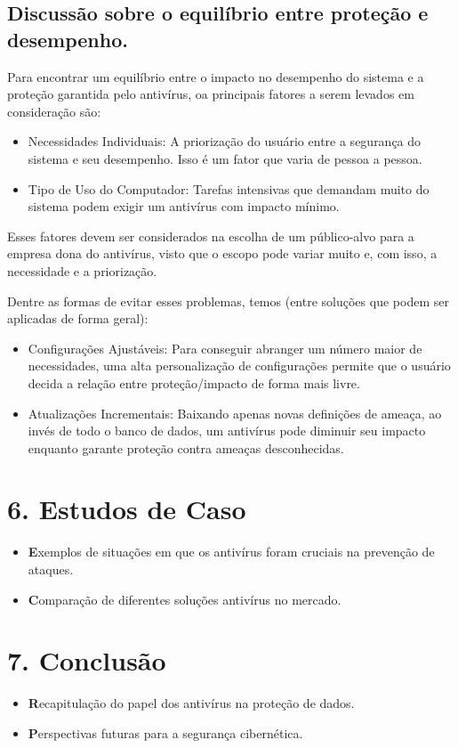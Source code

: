 \documentclass[10pt,conference,twocolumn]{article}
\begin{document}
\subsection*{Discussão sobre o equilíbrio entre proteção e desempenho.}
Para encontrar um equilíbrio entre o impacto no desempenho do sistema e a proteção garantida pelo antivírus, oa principais fatores a serem levados em consideração são:
\begin{itemize}
\item
Necessidades Individuais:
A priorização do usuário entre a segurança do sistema e seu desempenho. Isso é um fator que varia de pessoa a pessoa.
\item
Tipo de Uso do Computador: 
Tarefas intensivas que demandam muito do sistema podem exigir um antivírus com impacto mínimo.
\end{itemize}

Esses fatores devem ser considerados na escolha de um público-alvo para a empresa dona do antivírus, visto que o escopo pode variar muito e, com isso, a necessidade e a priorização.\newline

Dentre as formas de evitar esses problemas, temos (entre soluções que podem ser aplicadas de forma geral):
\begin{itemize}
\item
Configurações Ajustáveis: 
Para conseguir abranger um número maior de necessidades, uma alta personalização de configurações permite que o usuário decida a relação entre proteção/impacto de forma mais livre.
\item
Atualizações Incrementais: 
Baixando apenas novas definições de ameaça, ao invés de todo o banco de dados, um antivírus pode diminuir seu impacto enquanto garante proteção contra ameaças desconhecidas.
\end{itemize}

\section*{6. Estudos de Caso}
 \begin{itemize}
\item \textbf Exemplos de situações em que os antivírus foram cruciais na prevenção de ataques.
\item \textbf Comparação de diferentes soluções antivírus no mercado.
\end{itemize}

\section* {7. Conclusão}
 \begin{itemize}
\item \textbf Recapitulação do papel dos antivírus na proteção de dados.
\item \textbf Perspectivas futuras para a segurança cibernética.
\end{itemize}
\end{document}
